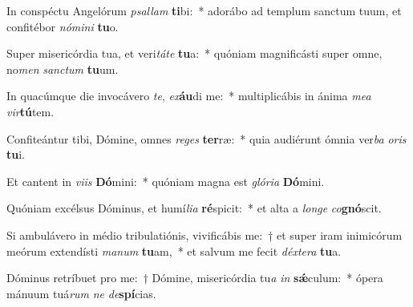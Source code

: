 \item In conspéctu Angelórum \textit{psal}\textit{lam} \textbf{ti}bi:~* adorábo ad templum sanctum tuum, et confitébor \textit{nó}\textit{mi}\textit{ni} \textbf{tu}o.
\item Super misericórdia tua, et veri\textit{tá}\textit{te} \textbf{tu}a:~* quóniam magnificásti super omne, no\textit{men} \textit{sanc}\textit{tum} \textbf{tu}um.
\item In quacúmque die invocávero \textit{te}, \textit{ex}\textbf{áu}di me:~* multiplicábis in ánima \textit{me}\textit{a} \textit{vir}\textbf{tú}tem.
\item Confiteántur tibi, Dómine, omnes \textit{re}\textit{ges} \textbf{ter}ræ:~* quia audiérunt ómnia ver\textit{ba} \textit{o}\textit{ris} \textbf{tu}i.
\item Et cantent in \textit{vi}\textit{is} \textbf{Dó}mini:~* quóniam magna est \textit{gló}\textit{ri}\textit{a} \textbf{Dó}mini.
\item Quóniam excélsus Dóminus, et humí\textit{li}\textit{a} \textbf{ré}spicit:~* et alta a \textit{lon}\textit{ge} \textit{co}\textbf{gnó}scit.
\item Si ambulávero in médio tribulatiónis, vivificábis me:~† et super iram inimicórum meórum extendísti \textit{ma}\textit{num} \textbf{tu}am,~* et salvum me fecit \textit{déx}\textit{te}\textit{ra} \textbf{tu}a.
\item Dóminus retríbuet pro me:~† Dómine, misericórdia tu\textit{a} \textit{in} \textbf{sǽ}culum:~* ópera mánuum tuá\textit{rum} \textit{ne} \textit{de}\textbf{spí}cias.
